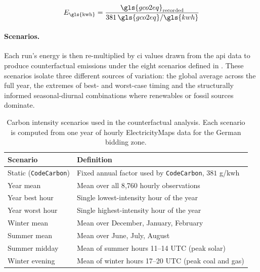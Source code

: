 \begin{equation}
E_{\text{\gls{kwh}}} = \frac{{\gls{gco2eq}}_{\text{recorded}}}{381 \, \gls{gco2eq}/\gls{kwh}}
\label{eq:energy_derivation}
\end{equation}

\paragraph{Scenarios.}
Each run's energy is then re-multiplied by \gls{ci} values drawn from the \gls{api} data to produce counterfactual emissions under the eight scenarios defined in . These scenarios isolate three different sources of variation: the global average across the full year, the extremes of best- and worst-case timing and the structurally informed seasonal-diurnal combinations where renewables or fossil sources dominate.

\begin{table}[htbp]
\centering
\caption[Carbon intensity scenarios for counterfactual analysis.]{Carbon intensity scenarios used in the counterfactual analysis. Each scenario is computed from one year of hourly ElectricityMaps data for the German bidding zone.}
\label{tab:carbon_scenarios}
\begin{tabular}{ll}
\toprule
\textbf{Scenario} & \textbf{Definition} \\
\midrule
Static (\texttt{CodeCarbon}) & Fixed annual factor used by \texttt{CodeCarbon}, $381$ g/\gls{kwh} \\
Year mean           & Mean over all 8{,}760 hourly observations \\
Year best hour      & Single lowest-intensity hour of the year \\
Year worst hour     & Single highest-intensity hour of the year \\
Winter mean         & Mean over December, January, February \\
Summer mean         & Mean over June, July, August \\
Summer midday       & Mean of summer hours 11--14 UTC (peak solar) \\
Winter evening      & Mean of winter hours 17--20 UTC (peak coal and gas) \\
\bottomrule
\end{tabular}
\end{table}

